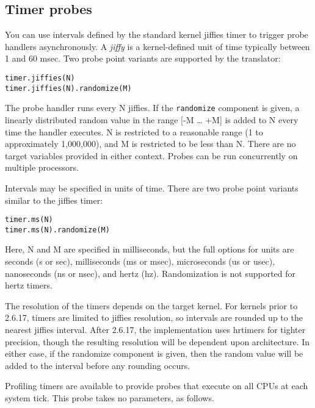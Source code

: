 \documentclass[twoside,english]{article}
\newenvironment{vindent}
{\begin{list}{}{\setlength{\listparindent}{6pt}}
\item[]}
{\end{list}}
\begin{document}
\subsection{Timer probes}
You can use intervals defined by the standard kernel jiffies
timer to trigger probe handlers asynchronously. A \emph{jiffy} is a kernel-defined
unit of time typically between 1 and 60 msec. Two probe point variants are
supported by the translator: 

\begin{vindent}
\begin{verbatim}
timer.jiffies(N)
timer.jiffies(N).randomize(M)
\end{verbatim}
\end{vindent}
The probe handler runs every N jiffies. If the \texttt{randomize}
component is given, a linearly distributed random value in the range {[}-M
\ldots{} +M] is added to N every time the handler executes. N is restricted
to a reasonable range (1 to approximately 1,000,000), and M is restricted
to be less than N. There are no target variables provided in either context.
Probes can be run concurrently on multiple processors.

Intervals may be specified in units of time. There are two probe point variants
similar to the jiffies timer:

\begin{vindent}
\begin{verbatim}
timer.ms(N)
timer.ms(N).randomize(M)
\end{verbatim}
\end{vindent}
Here, N and M are specified in milliseconds, but the
full options for units are seconds (s or sec), milliseconds (ms or msec),
microseconds (us or usec), nanoseconds (ns or nsec), and hertz (hz). Randomization
is not supported for hertz timers.

The resolution of the timers depends on the target kernel. For kernels prior
to 2.6.17, timers are limited to jiffies resolution, so intervals are rounded
up to the nearest jiffies interval. After 2.6.17, the implementation uses
hrtimers for tighter precision, though the resulting resolution will be dependent
upon architecture. In either case, if the randomize component is given, then
the random value will be added to the interval before any rounding occurs.

Profiling timers are available to provide probes that execute on all CPUs
at each system tick. This probe takes no parameters, as follows.
\end{document}
